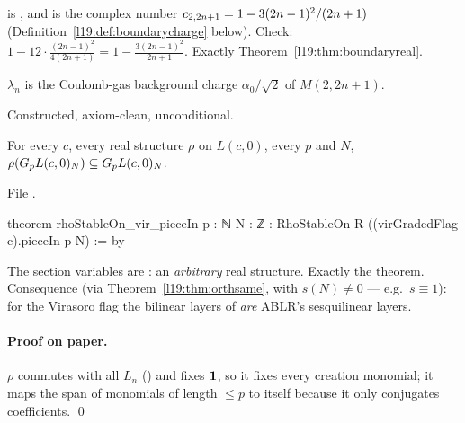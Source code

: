 \begin{dictionary}
 is , and
 is the complex number $c_{2,2n+1} = 1-3(2n-1)^2/(2n+1)$
(Definition~\ref{l19:def:boundarycharge} below). Check: $1-12\cdot\frac{(2n-1)^2}{4(2n+1)} =
1-\frac{3(2n-1)^2}{2n+1}$. Exactly Theorem~\ref{l19:thm:boundaryreal}.
\end{dictionary}

\begin{physics}
$\lambda_n$ is the Coulomb-gas background charge $\alpha_0/\sqrt2$ of $M(2,2n+1)$.
\end{physics}

\begin{status}
Constructed, axiom-clean, unconditional.
\end{status}

\begin{theorem}\label{l19:thm:rhostable}
For every $c$, every real structure $\rho$ on $L(c,0)$, every $p$ and $N$, $\rho(G_pL(c,0)_N)\subseteq
G_pL(c,0)_N$.
\end{theorem}

\noindent File .
\begin{leancode}
theorem rhoStableOn_vir_pieceIn {p : ℕ} {N : ℤ} :
    RhoStableOn R ((virGradedFlag c).pieceIn p N) := by
\end{leancode}

\begin{dictionary}
The section variables are : an \emph{arbitrary}
real structure. Exactly the theorem. Consequence (via Theorem~\ref{l19:thm:orthsame}, with $s(N)\ne0$
--- e.g.\ $s\equiv1$): for the Virasoro flag the bilinear layers of  \emph{are} ABLR's
sesquilinear layers.
\end{dictionary}

\paragraph{Proof on paper.} $\rho$ commutes with all $L_n$ () and fixes $\mathbf{1}$, so it
fixes every creation monomial; it maps the span of monomials of length $\le p$ to itself because it only
conjugates coefficients. \qed

